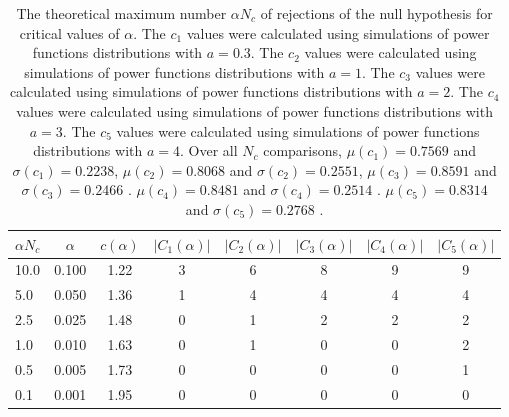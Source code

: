 \begin{table}[h!]
\begin{center}
\begin{tabular}{| l | c | c | c | c | c | c | c |}\hline
$\alpha N_c$ & $\alpha$ & $c(\alpha)$ & $|C_1(\alpha)|$ & $|C_2(\alpha)|$ & $|C_3(\alpha)|$ & $|C_4(\alpha)|$ & $|C_5(\alpha)|$ \\\hline
10.0 & 0.100 & 1.22 & 3 & 6 & 8 & 9 & 9 \\\hline
5.0 & 0.050 & 1.36 & 1 & 4 & 4 & 4 & 4 \\\hline
2.5 & 0.025 & 1.48 & 0 & 1 & 2 & 2 & 2 \\\hline
1.0 & 0.010 & 1.63 & 0 & 1 & 0 & 0 & 2 \\\hline
0.5 & 0.005 & 1.73 & 0 & 0 & 0 & 0 & 1 \\\hline
0.1 & 0.001 & 1.95 & 0 & 0 & 0 & 0 & 0 \\\hline
\end{tabular}
\caption{The theoretical maximum number $\alpha N_c$ of rejections
        of the null hypothesis for critical values of $\alpha$.
        The $c_1$ values were calculated using simulations of power functions distributions with $a=0.3$.
        The $c_2$ values were calculated using simulations of power functions distributions with $a=1$.
        The $c_3$ values were calculated using simulations of power functions distributions with $a=2$.
        The $c_4$ values were calculated using simulations of power functions distributions with $a=3$.
        The $c_5$ values were calculated using simulations of power functions distributions with $a=4$.
        Over all $N_c$ comparisons,
         $\mu(c_1)=0.7569$ and $\sigma(c_1)=0.2238$,
         $\mu(c_2)=0.8068$ and $\sigma(c_2)=0.2551$,
         $\mu(c_3)=0.8591$ and $\sigma(c_3)=0.2466$ .
         $\mu(c_4)=0.8481$ and $\sigma(c_4)=0.2514$ .
         $\mu(c_5)=0.8314$ and $\sigma(c_5)=0.2768$ .
        }
\end{center}
\end{table}